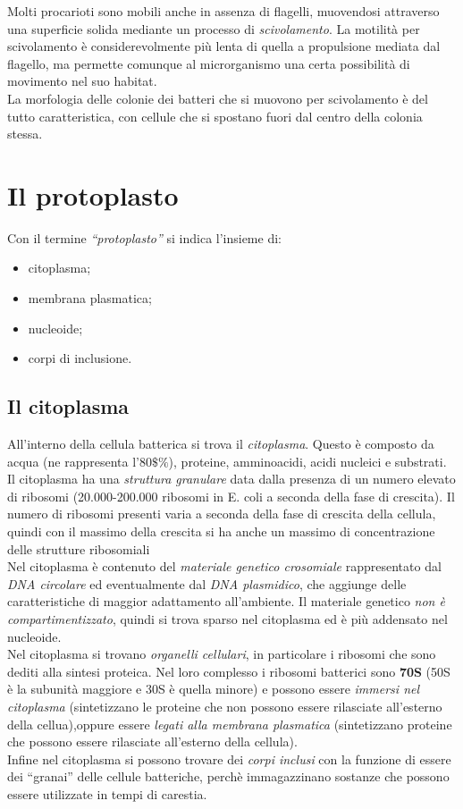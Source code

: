 \documentclass[11pt]{book}
\begin{document}
\vspace{1em}
Molti procarioti sono mobili anche in assenza di flagelli, muovendosi attraverso una superficie solida mediante un processo di \emph{scivolamento}. La motilità per scivolamento è considerevolmente più lenta di quella a propulsione mediata dal flagello, ma permette comunque al microrganismo una certa possibilità di movimento nel suo habitat.\\
La morfologia delle colonie dei batteri che si muovono per scivolamento è del tutto caratteristica, con cellule che si spostano fuori dal centro della colonia stessa.

\chapter{Il protoplasto}

Con il termine \emph{``protoplasto''} si indica l'insieme di:
\begin{itemize}
\item citoplasma; 
\item membrana plasmatica;
\item nucleoide;
\item corpi di inclusione.
\end{itemize}

\section{Il citoplasma}
All'interno della cellula batterica si trova il \emph{citoplasma}. Questo è composto da acqua (ne rappresenta l'80$\$\%$), proteine, amminoacidi, acidi nucleici e substrati.\\
Il citoplasma ha una \emph{struttura granulare} data dalla presenza di un numero elevato di ribosomi (20.000-200.000 ribosomi in E. coli a seconda della fase di crescita). Il numero di ribosomi presenti varia a seconda della fase di crescita della cellula, quindi con il massimo della crescita si ha anche un massimo di concentrazione delle strutture ribosomiali \\
Nel citoplasma è contenuto del \emph{materiale genetico crosomiale} rappresentato dal \emph{DNA circolare} ed eventualmente dal \emph{DNA plasmidico}, che aggiunge delle caratteristiche di maggior adattamento all'ambiente. Il materiale genetico \emph{non è compartimentizzato}, quindi si trova sparso nel citoplasma ed è più addensato nel nucleoide.\\
Nel citoplasma si trovano \emph{organelli cellulari}, in particolare i ribosomi che sono dediti alla sintesi proteica. Nel loro complesso i ribosomi batterici sono \textbf{70S} (50S è la subunità maggiore e 30S è quella minore) e possono essere \emph{immersi nel citoplasma} (sintetizzano le proteine che non possono essere rilasciate all'esterno della cellua),oppure essere \emph{legati alla membrana plasmatica} (sintetizzano proteine che possono essere rilasciate all'esterno della cellula).\\
Infine nel citoplasma si possono trovare dei \emph{corpi inclusi} con la funzione di essere dei ``granai'' delle cellule batteriche, perchè immagazzinano sostanze che possono essere utilizzate in tempi di carestia.
\end{document}
